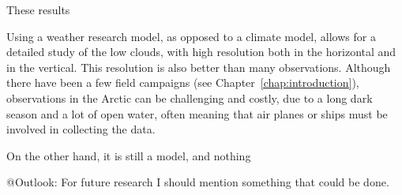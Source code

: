 These results

Using a weather research model, as opposed to a climate model, allows for a detailed study of the low clouds, with high resolution both in the horizontal and in the vertical. This resolution is also better than many observations. Although there have been a few field campaigns (see Chapter~\ref{chap:introduction}), observations in the Arctic can be challenging and costly, due to a long dark season and a lot of open water, often meaning that air planes or ships must be involved in collecting the data.

On the other hand, it is still a model, and nothing

@Outlook: For future research I should mention something that could be done.


